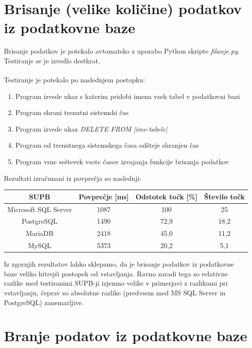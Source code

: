 \documentclass[a4paper,11pt]{report}
\begin{document}
\section{Brisanje (velike količine) podatkov iz podatkovne baze}
Brisanje podatkov je potekalo avtomatsko z uporabo Python skripte \textit{filanje.py}. Testiranje se je izvedlo destkrat.
\\\\

Testiranje je potekalo po naslednjem postopku:
\begin{enumerate}
   \item Program izvede ukaz s katerim pridobi imena vseh tabel v podatkovni bazi
      \item Program shrani trenutni sistemski čas
      \item Program izvede ukaz \textit{DELETE FROM |ime-tabele|}
      \item Program od trenutnega sistemskega časa odšteje shranjen čas
   \item Program vrne seštevek vsote časov izvajanja funkcije brisanja podatkov
\end{enumerate}

\pagebreak
Rezultati izračunani iz povprečja so naslednji:
\begin{center}
   \begin{tabular}{||c|c|c|c||}
      \hline
      \textbf{SUPB} & \textbf{Povprečje [ms]} & \textbf{Odstotek točk [\%] } & \textbf{Število točk}\\
      \hline
      \hline
      Microsoft SQL Server & 1087 & 100 & 25\\
      PostgreSQL & 1490 & 72,9 & 18,2\\
      MariaDB & 2418 & 45,0 & 11,2\\
      MySQL & 5373 & 20,2 & 5,1\\
      \hline
   \end{tabular}
\end{center}

Iz zgornjih rezultatov lahko sklepamo, da je brisanje podatkov iz podatkovne baze veliko hitrejši postopek od vstavljanja.
Ravno zaradi tega so relativne razlike med testiranimi SUPB-ji izjemno velike v primerjavi z razlikami pri vstavljanju, čeprav
so absolutne razlike (predvsem med MS SQL Server in PostgreSQL) zanemarljive.

\section{Branje podatov iz podatkovne baze}
\end{document}
